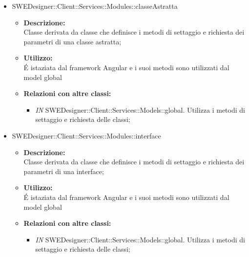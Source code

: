 \begin{itemize}
\begin{itemize}
		\item SWEDesigner::Client::Services::Modules::classeAstratta
		\begin{itemize}
			\item \textbf{Descrizione:}\\
			Classe derivata da classe che definisce i metodi di settaggio e richiesta dei parametri di una classe astratta;
			\item \textbf{Utilizzo:}\\
			É istaziata dal framework Angular e i suoi metodi sono utilizzati dal model global
			\item \textbf{Relazioni con altre classi: }
			\begin{itemize}
			\item \emph{IN} SWEDesigner::Client::Services::Models::global. Utilizza i metodi di settaggio e richiesta delle classi;
			\end{itemize}
		\end{itemize}
		
		
		\item SWEDesigner::Client::Services::Modules::interface
		\begin{itemize}
			\item \textbf{Descrizione:}\\
			Classe derivata da classe che definisce i metodi di settaggio e richiesta dei parametri di una interface;
			\item \textbf{Utilizzo:}\\
			É istaziata dal framework Angular e i suoi metodi sono utilizzati dal model global
			\item \textbf{Relazioni con altre classi: }
			\begin{itemize}
			\item \emph{IN} SWEDesigner::Client::Services::Models::global. Utilizza i metodi di settaggio e richiesta delle classi;
			\end{itemize}
		\end{itemize}
		
		
		\end{itemize}
				\end{itemize}




